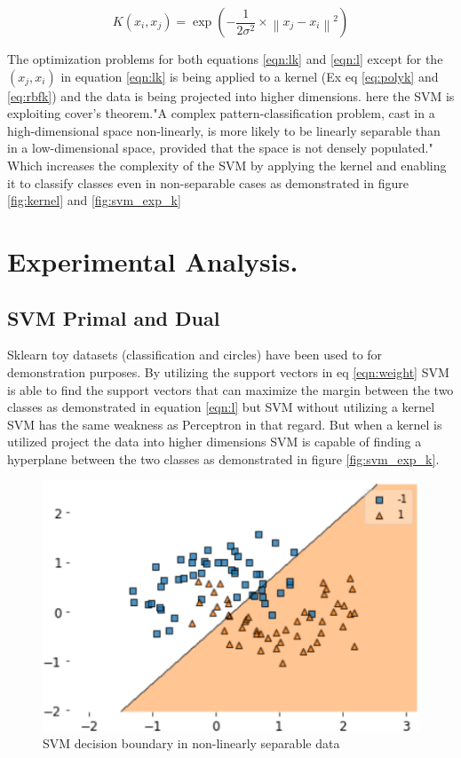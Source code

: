 \documentclass[10pt,twocolumn,letterpaper]{article}
\begin{document}
\begin{equation}
K\left( x_{i},x_{j}\right) =\exp \left( -\dfrac{1}{2\sigma ^{2}}\times \left\| x_{j}-x_{i}\right\| ^{2}\right) 
\label{eq:rbfk}
\end{equation}

The optimization problems for both equations \ref{eqn:lk} and \ref{eqn:l} except for the $( x_{j},x_{i})$ in equation \ref{eqn:lk} is being applied to a kernel (Ex eq \ref{eq:polyk} and \ref{eq:rbfk}) and the data is being projected into higher dimensions. here the SVM is exploiting cover's theorem."A complex pattern-classification problem, cast in a high-dimensional space non-linearly, is more likely to be linearly separable than in a low-dimensional space, provided that the space is not densely populated." \cite{Cover1965} Which increases the complexity of the SVM by applying the kernel and enabling it to classify classes even in non-separable cases as demonstrated in figure \ref{fig:kernel} and \ref{fig:svm_exp_k}

\section{Experimental Analysis.}

\subsection{SVM Primal and Dual}
Sklearn toy datasets (classification and circles) have been used to for demonstration purposes. By utilizing the support vectors in eq \ref{eqn:weight} SVM is able to find the support vectors that can maximize the margin between the two classes as demonstrated in equation \ref{eqn:l} but SVM without utilizing a kernel SVM has the same weakness as Perceptron \cite{Rosenblatt1958} \cite{Minsky1969} \cite{Murphy2017} in that regard. But when a kernel is utilized project the data into higher dimensions SVM is capable of finding a hyperplane between the two classes as demonstrated in figure \ref{fig:svm_exp_k}.

\begin{figure}[htb]
  \includegraphics[width=\linewidth]{svm_lin_non_sep.png}
  \caption{SVM decision boundary in non-linearly separable data}
  \label{fig:svm_exp_non_lin}
\end{figure}
\end{document}
